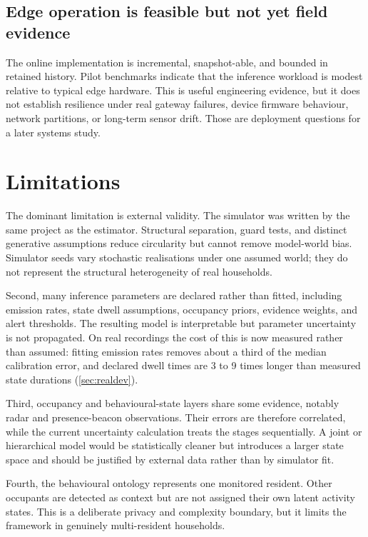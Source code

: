\documentclass[11pt]{article}
\begin{document}
\subsection{Edge operation is feasible but not yet field evidence}

The online implementation is incremental, snapshot-able, and bounded in retained history. Pilot benchmarks indicate that the inference workload is modest relative to typical edge hardware. This is useful engineering evidence, but it does not establish resilience under real gateway failures, device firmware behaviour, network partitions, or long-term sensor drift. Those are deployment questions for a later systems study.

\section{Limitations}
\label{sec:limitations}

The dominant limitation is external validity. The simulator was written by the same project as the estimator. Structural separation, guard tests, and distinct generative assumptions reduce circularity but cannot remove model-world bias. Simulator seeds vary stochastic realisations under one assumed world; they do not represent the structural heterogeneity of real households.

Second, many inference parameters are declared rather than fitted, including emission rates, state dwell assumptions, occupancy priors, evidence weights, and alert thresholds. The resulting model is interpretable but parameter uncertainty is not propagated. On real recordings the cost of this is now
measured rather than assumed: fitting emission rates removes about a third of
the median calibration error, and declared dwell times are 3 to 9 times longer
than measured state durations (\cref{sec:realdev}).

Third, occupancy and behavioural-state layers share some evidence, notably radar and presence-beacon observations. Their errors are therefore correlated, while the current uncertainty calculation treats the stages sequentially. A joint or hierarchical model would be statistically cleaner but introduces a larger state space and should be justified by external data rather than by simulator fit.

Fourth, the behavioural ontology represents one monitored resident. Other occupants are detected as context but are not assigned their own latent activity states. This is a deliberate privacy and complexity boundary, but it limits the framework in genuinely multi-resident households.
\end{document}
